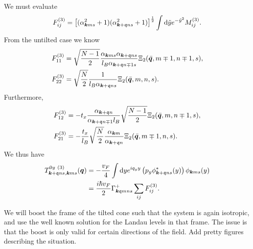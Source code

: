 We must evaluate
\begin{equation}
  \label{eq:59}
  F^{(3)}_{ij} = \left[(\alpha_{\bm{k} m s}^2  + 1) ( \alpha _{\bm{k} + \mathfrak{q} ns}^2 + 1 )\right]^{\frac{1}{2}} \int \mathrm{d} \tilde{y} e^{-\tilde{y}^2} M^{(3)}_{ij}.
\end{equation}
From the untilted case we know
\begin{align}
  F^{(3)}_{11} &= \sqrt{\frac{N-1}{2}}
                 \frac{\alpha_{\bm{k} m s} \alpha_{\bm{k}+\mathfrak{q} n s}}{l_{B} \alpha _{\bm{k} + \mathfrak{q} n \mp 1 s}}
                 \Xi_2( \bar{\bm{q}}, m\mp 1, n\mp 1, s ),\\
  F^{(3)}_{22} &= \sqrt{\frac{N}{2}}
                 \frac{1}{l_{B} \alpha _{\bm{k} + \mathfrak{q} n s}}
                 \Xi_{2} (\bar{\bm{q}}, m, n, s).
\end{align}
Furthermore,
\begin{align}
  F^{(3)}_{12} &= -t_x \frac{\alpha _{\bm{k} + \mathfrak{q} n}}{\alpha _{\bm{k}+\mathfrak{q} n \mp 1} l_{B}}
                 \sqrt{\frac{N-1}{2}}
                 \Xi_{2} (\bar{\bm{q}}, m, n \mp 1, s),\\
  F^{(3)}_{21} &= -\frac{t_x}{l_{B}}
                 \sqrt{\frac{N}{2}}
                 \frac{\alpha_{\bm{k} m}}{\alpha _{\bm{k} + \mathfrak{q} n}}
                 \Xi_2 ( \bar{\bm{q}}, m \mp 1, n, s ).
\end{align}
We thus have
\begin{align}
  \label{eq:60}
  T^{0y~(3)}_{\bm{k} + \mathfrak{q} ns, \bm{k} ms} (\bm{q})
  &= - \frac{v_F}{4}
    \int \mathrm{d} y
    e^{i q_y y}
    \left( p_y \phi ^{*}_{\bm{k} + \mathfrak{q} ns}(y) \right) \phi _{\bm{k} m s}(y)\\
  &= \frac{i \hbar v_F}{2}
    \Gamma ^{+}_{\bm{k} \mathfrak{q} m n s}
    \sum\limits_{ij}^{} F^{(3)}_{ij}.
\end{align}











We will boost the frame of the tilted cone such that the system is again isotropic, and use the well known solution for the Landau levels in that frame.
The issue is that the boost is only valid for certain directions of the field.
Add pretty figures describing the situation.


